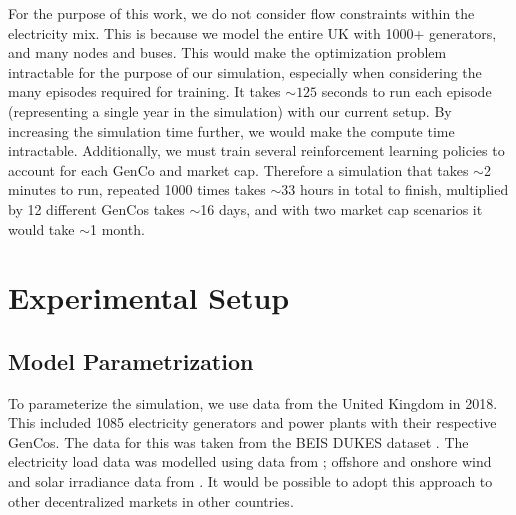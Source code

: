 \documentclass[conference]{IEEEtran}
\begin{document}
For the purpose of this work, we do not consider flow constraints within the electricity mix. This is because we model the entire UK with 1000+ generators, and many nodes and buses. This would make the optimization problem intractable for the purpose of our simulation, especially when considering the many episodes required for training. It takes ${\sim}125$ seconds to run each episode (representing a single year in the simulation) with our current setup. By increasing the simulation time further, we would make the compute time intractable. Additionally, we must train several reinforcement learning policies to account for each GenCo and market cap. Therefore a simulation that takes ${\sim}$2 minutes to run, repeated 1000 times takes ${\sim}$33 hours in total to finish, multiplied by 12 different GenCos takes ${\sim}$16 days, and with two market cap scenarios it would take ${\sim}$1 month.









\section{Experimental Setup}
\label{sec:methodology}

\subsection{Model Parametrization}

To parameterize the simulation, we use data from the United Kingdom in 2018. This included 1085 electricity generators and power plants with their respective GenCos. The data for this was taken from the BEIS DUKES dataset \cite{dukes_511}. The electricity load data was modelled using data from \cite{gridwatch}; offshore and onshore wind and solar irradiance data from \cite{Pfenninger2016}. It would be possible to adopt this approach to other decentralized markets in other countries.
\end{document}
